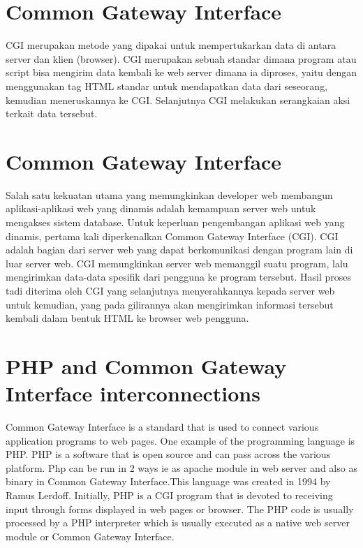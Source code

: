 
\section{Common Gateway Interface}
CGI merupakan metode yang dipakai untuk mempertukarkan data di antara server dan klien (browser). CGI merupakan sebuah standar dimana program atau script bisa mengirim data kembali ke web server dimana ia diproses, yaitu dengan menggunakan tag HTML standar untuk mendapatkan data dari seseorang, kemudian meneruskannya ke CGI. Selanjutnya CGI melakukan serangkaian aksi terkait data tersebut\cite{prihatmoko2013pengembangan}.

\section{Common Gateway Interface}
Salah satu kekuatan utama yang memungkinkan developer web membangun aplikasi-aplikasi web yang dinamis adalah kemampuan server web untuk mengakses sistem database. Untuk keperluan pengembangan aplikasi web yang dinamis, pertama kali diperkenalkan Common Gateway Interface (CGI). CGI adalah bagian dari server web yang dapat berkomunikasi dengan program lain di luar server web. CGI memungkinkan server web memanggil suatu program, lalu mengirimkan data-data spesifik dari pengguna ke program tersebut. Hasil proses tadi diterima oleh CGI yang selanjutnya menyerahkannya kepada server web untuk kemudian, yang pada gilirannya akan mengirimkan informasi tersebut kembali dalam bentuk HTML ke browser web pengguna.

\section{PHP and Common Gateway Interface interconnections }
Common Gateway Interface is a standard that is used to connect various application programs to web pages. One example of the programming language is PHP. PHP is a software that is open source and can pass across the various platform. Php can be run in 2 ways ie as apache module in web server and also as binary in Common Gateway Interface.This language was created in 1994 by Ramus Lerdoff.  Initially, PHP is a CGI program that is devoted to receiving input through forms displayed in web pages or browser. The PHP code is usually processed by a PHP interpreter which is usually executed as a native web server module or Common Gateway Interface.



